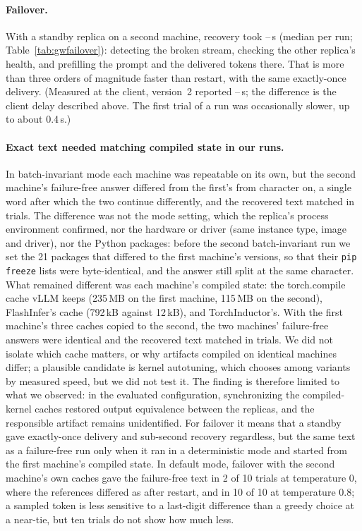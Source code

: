 \documentclass[10pt,twocolumn]{article}
\begin{document}
\paragraph{Failover.} With a standby replica on a second machine, recovery
took \GwFailoverMin--\GwFailoverMax\,s (median per run;
Table~\ref{tab:gwfailover}): detecting the broken stream, checking the other
replica's health, and prefilling the prompt and the delivered tokens there.
That is more than three orders of magnitude faster than restart, with the
same exactly-once delivery. (Measured at the client, version~2 reported
\GwFailoverClientMin--\GwFailoverClientMax\,s; the difference is the client
delay described above. The first trial of a run was occasionally slower, up
to about 0.4\,s.)

\paragraph{Exact text needed matching compiled state in our runs.} In batch-invariant
mode each machine was repeatable on its own, but the second machine's
failure-free answer differed from the first's from character
\GwSplitChar{} on, a single word after which the two continue differently,
and the recovered text matched in \GwOwnCacheSame{} trials. The difference
was not the mode setting, which the replica's process environment confirmed,
nor the hardware or driver (same instance type, image and driver), nor the
Python packages: before the second batch-invariant run we set the 21 packages
that differed to the first machine's versions, so that their \texttt{pip
freeze} lists were byte-identical, and the answer still split at the same
character. What remained different was each machine's compiled state: the
torch.compile cache vLLM keeps (235\,MB on the first machine, 115\,MB on the
second), FlashInfer's cache (792\,kB against 12\,kB), and TorchInductor's.
With the first machine's three caches copied to the second, the two
machines' failure-free answers were identical and the recovered text matched
in \GwSharedCacheSame{} trials. We did not isolate which cache matters, or
why artifacts compiled on identical machines differ; a plausible candidate is
kernel autotuning, which chooses among variants by measured speed, but we
did not test it. The finding is therefore limited to what we observed: in
the evaluated configuration, synchronizing the compiled-kernel caches
restored output equivalence between the replicas, and the responsible
artifact remains unidentified. For failover it means that a standby gave
exactly-once delivery and sub-second recovery regardless, but the same text
as a failure-free run only when it ran in a deterministic mode and started
from the first machine's compiled state. In default mode, failover with the second machine's own caches gave the
failure-free text in 2 of 10 trials at temperature 0, where the references
differed as after restart, and in 10 of 10 at temperature 0.8; a sampled token is less sensitive to a
last-digit difference than a greedy choice at a near-tie, but ten trials do
not show how much less.
\end{document}
